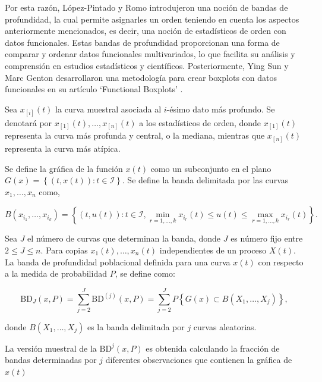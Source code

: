 Por esta razón, López-Pintado y Romo introdujeron una noción de bandas de profundidad, la cual permite asignarles un orden teniendo en cuenta los aspectos anteriormente mencionados, es decir, una noción de estadísticos de orden con datos funcionales. Estas bandas de profundidad proporcionan una forma de comparar y ordenar datos funcionales multivariados, lo que facilita su análisis y comprensión en estudios estadísticos y científicos. Posteriormente, Ying Sun y Marc Genton desarrollaron una metodología para crear boxplots con datos funcionales en su artículo `Functional Boxplots' \cite{boxplotFun}.

Sea $x_{[i]}(t)$ la curva muestral asociada al $i$-ésimo dato más profundo. Se denotará por $x_{[1]}(t), \dots, x_{[n]}(t)$ a los estadísticos de orden, donde $x_{[1]}(t)$ representa la curva más profunda y central, o la mediana, mientras que $x_{[n]}(t)$ representa la curva más atípica.


\begin{defn}[Banda]
    Se define la gráfica de la función $x(t)$ como un subconjunto en el plano $G(x) =  \left\{ (t, x(t)): t \in \mathcal{I} \right\}$. Se define la banda delimitada por las curvas $x_1, \dots, x_n$ como,
    
    \begin{equation}
        B\left(x_{i_1}, \ldots, x_{i_k}\right)=\left\{(t, u(t)): t \in \mathcal{I}, \min_{r=1, \ldots, k} x_{i_r}(t) \leq u(t) \leq \max _{r=1, \ldots, k} x_{i_r}(t)\right\}.
    \end{equation}
\end{defn}

\begin{defn}
    Sea $J$ el número de curvas que determinan la banda, donde $J$ es número fijo entre $2 \leq J \leq n$. Para copias $x_1(t), \dots, x_n(t)$ independientes de un proceso $X(t)$. La banda de profundidad poblacional definida para una curva $x(t)$ con respecto a la medida de probabilidad $P$, se define como:

    \begin{equation}
        \mathrm{BD}_J(x, P)=\sum_{j=2}^J \mathrm{BD}^{(j)}(x, P)=\sum_{j=2}^J P\left\{G(x) \subset B\left(X_1, \ldots, X_j\right)\right\},
    \end{equation}

    donde $B(X_1, \dots, X_j)$ es la banda delimitada por $j$ curvas aleatorias.
\end{defn}

La versión muestral de la $\mathrm{BD}^{j}(x, P)$ es obtenida calculando la fracción de bandas determinadas por $j$ diferentes observaciones que contienen la gráfica de $x(t)$

